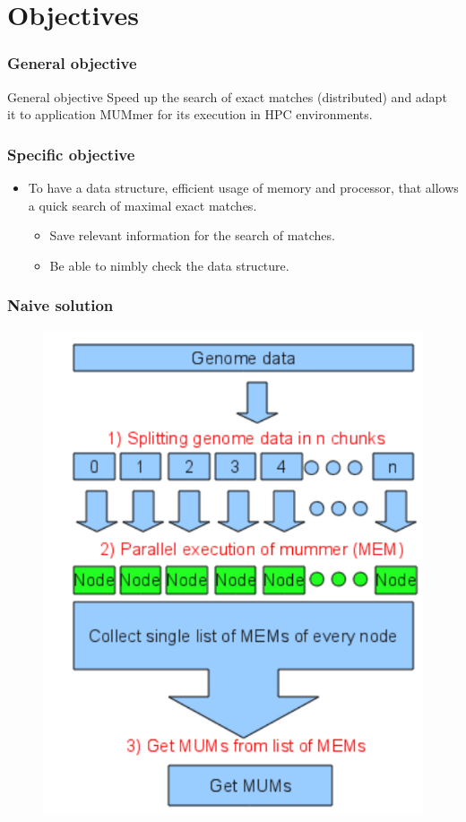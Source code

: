 \documentclass{beamer}
\begin{document}
\section{Objectives}
\begin{frame}
 \frametitle{General objective}
 \begin{block}{General objective}
Speed up the search of exact matches (distributed) and adapt it to application MUMmer for its execution in HPC environments.
\end{block}
\end{frame}
\begin{frame}
\frametitle{Specific objective}
\begin{block}{}
\begin{itemize}
\item To have a data structure, efficient usage of memory and processor, that allows a quick search of maximal exact matches.
  \begin{itemize}
    \item Save relevant information for the search of matches.
    \item Be able to nimbly check the data structure.
  \end{itemize}
  \end{itemize}
\end{block}
\end{frame}
\begin{frame}
  \frametitle{Naive solution}
  \begin{figure}\includegraphics[scale=0.6]{algorithm.pdf}\end{figure}
\end{frame}
\end{document}
